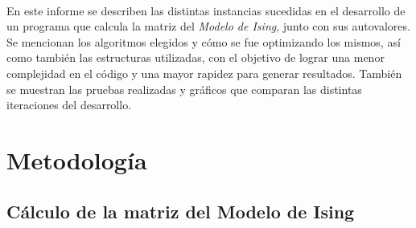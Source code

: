 \documentclass[a4paper,11pt]{article}
\begin{document}
\paragraph{}
En este informe se describen las distintas instancias sucedidas en el desarrollo de un programa que calcula la matriz del \emph{Modelo de Ising}, junto con sus autovalores. Se mencionan los algoritmos elegidos y c\'omo se fue optimizando los mismos, as\'i como tambi\'en las estructuras utilizadas, con el objetivo de lograr una menor complejidad en el c\'odigo y una mayor rapidez para generar resultados. Tambi\'en se muestran las pruebas realizadas y gr\'aficos que comparan las distintas iteraciones del desarrollo.
\newpage
\section{Metodolog\'ia}

\subsection{C\'alculo de la matriz del Modelo de Ising}
\end{document}
